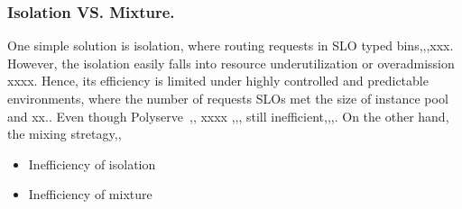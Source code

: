 \subsubsection{Isolation VS. Mixture.} One simple solution is isolation, where routing requests in SLO typed bins,,,xxx. However, the isolation easily falls into resource underutilization or overadmission xxxx. Hence, its efficiency is limited under highly controlled and predictable environments, where the number of requests SLOs met the size of instance pool and xx.. Even though Polyserve~\cite{polyserve},, xxxx ,,, still inefficient,,,.
On the other hand, the mixing stretagy,,
\begin{itemize}
    \item Inefficiency of isolation
    \item Inefficiency of mixture
\end{itemize}
